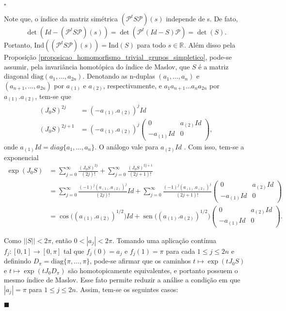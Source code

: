 \documentclass[12pt]{book}
\newenvironment{prova}[1]{$\square$ #1}{\hfill$\blacksquare$}
\DeclareMathOperator{\sen}{sen}
\newcommand{\diag}{\text{diag}}
\newcommand{\estruturacomplexa}{J_{0}}
\newcommand{\ind}{\text{Ind}}
\newcommand{\intervalo}{[0,1]}
\newcommand{\norma}[1]{||#1||}
\newcommand{\real}[1]{\mathbb{R}^{#1}}
\newcommand{\reta}{\real{}}
\begin{document}
\begin{prova}
\begin{enumerate}
			Note que, o índice da matriz simétrica $(\mathcal{P}^{t}S\mathcal{P})(s)$ independe de s. De fato, 
			$$
			\det(Id-(\mathcal{P}^{t}S\mathcal{P})(s)) = 			\det(\mathcal{P}^{t}(Id-S)\mathcal{P}) = \det(S).
			$$ 
			Portanto, $\ind((\mathcal{P}^{t}S\mathcal{P})(s)) = \ind(S)$ para todo $s \in \reta$. Além disso pela Proposição \ref{proposicao_homomorfismo_trivial_grupos_simpletico}, pode-se assumir, pela invariância homotópica do índice de Maslov, que $S$ é a matriz diagonal $\diag(a_{1},\dots,a_{2n})$. Denotando as n-duplas $(a_{1}, \dots, a_{n})$ e $(a_{n+1}, \dots, a_{2n})$ por $a_{(1)}$ e $a_{(2)}$, respectivamente, e $a_{1}a_{n+1}\dots a_{n}a_{2n}$ por $a_{(1)}.a_{(2)}$, tem-se que
			$$
			\begin{aligned}
			(\estruturacomplexa S)^{2j} &=(-a_{(1)}.a_{(2)})^{j} Id
			\\
			(\estruturacomplexa S)^{2j+1} 
			&= (-a_{(1)}.a_{(2)})^{j} 
			\left(
			\begin{array}{cc}
			0 & a_{(2)}Id
			\\
			-a_{(1)}Id & 0  
			\end{array}
			\right),
			\end{aligned}
			$$
			onde $a_{(1)}Id=diag\{a_{1}, \dots, a_{n}\}$. O análogo vale para $a_{(2)}Id$ . Com isso, tem-se a exponencial
			$$
			\begin{aligned}
			\exp(\estruturacomplexa S) &= \sum_{j=0}^{\infty}\frac{(\estruturacomplexa S)^{2j}}{(2j)!} + \sum_{j=0}^{\infty} \frac{(\estruturacomplexa S)^{2j+1}}{(2j+1)!}
			\\
			&= \sum_{j=0}^{\infty}\frac{(-1)^{j}(a_{(1)}.a_{(2)})^{j}}{(2j)!}Id + \sum_{j=0}^{\infty} \frac{(-1)^{j}(a_{(1)}.a_{(2)})^{j}}{(2j+1)!}	\left(
			\begin{array}{cc}
			0 & a_{(2)}Id
			\\
			-a_{(1)}Id & 0  
			\end{array}
			\right)
			\\
			&= \cos\big((a_{(1)}.a_{(2)})^{1/2}\big)Id +\sen\big((a_{(1)}.a_{(2)})^{1/2}\big)
			\left(
			\begin{array}{cc}
			0 & a_{(2)}Id
			\\
			-a_{(1)}Id & 0  
			\end{array}
			\right).
			\end{aligned}
			$$
			
			
			Como $\norma{S}<2\pi$, então $0<|a_{j}|<2\pi$. Tomando uma aplicação contínua $f_{j}:\intervalo \to [0,\pi]$ tal que $f_{j}(0) = a_{j}$ e $f_{j}(1) = \pi$ para cada $1\leq j \leq 2n$ e definindo $D_{\pi} = \diag\{\pi, \dots, \pi\}$, pode-se afirmar que os caminhos $t\mapsto \exp(t\estruturacomplexa S)$ e $t\mapsto \exp(t\estruturacomplexa D_{\pi})$ são homotopicamente equivalentes, e portanto possuem o mesmo índice de Maslov. Esse fato  permite reduzir a análise a condição em que $|a_{j}|=\pi$ para $1\leq j\leq 2n$. Assim, tem-se os seguintes casos:
			

\end{enumerate}
\end{prova}
\end{document}
